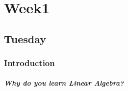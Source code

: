 
\chapter{Week1}

\section{Tuesday}

\subsection{Introduction}
\subsubsection{\textit{Why do you learn Linear Algebra?}}

